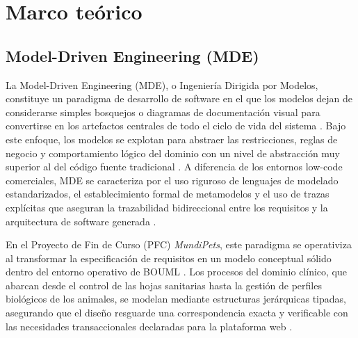 \documentclass[journal,onecolumn]{IEEEtran}
\begin{document}
	\section{Marco teórico}
	
	\subsection{Model-Driven Engineering (MDE)}
	La Model-Driven Engineering (MDE), o Ingeniería Dirigida por Modelos, constituye un paradigma de desarrollo de software en el que los modelos dejan de considerarse simples bosquejos o diagramas de documentación visual para convertirse en los artefactos centrales de todo el ciclo de vida del sistema \cite{Brambilla2017, Schmidt2006}. Bajo este enfoque, los modelos se explotan para abstraer las restricciones, reglas de negocio y comportamiento lógico del dominio con un nivel de abstracción muy superior al del código fuente tradicional \cite{Selic2003, Whittle2014}. A diferencia de los entornos low-code comerciales, MDE se caracteriza por el uso riguroso de lenguajes de modelado estandarizados, el establecimiento formal de metamodelos y el uso de trazas explícitas que aseguran la trazabilidad bidireccional entre los requisitos y la arquitectura de software generada \cite{DiRuscio2022LowCodeMDE, Bucaioni2022}.
	
	En el Proyecto de Fin de Curso (PFC) \textit{MundiPets}, este paradigma se operativiza al transformar la especificación de requisitos en un modelo conceptual sólido dentro del entorno operativo de BOUML \cite{ERSMundiPets2026, GuiaMDD2026}. Los procesos del dominio clínico, que abarcan desde el control de las hojas sanitarias hasta la gestión de perfiles biológicos de los animales, se modelan mediante estructuras jerárquicas tipadas, asegurando que el diseño resguarde una correspondencia exacta y verificable con las necesidades transaccionales declaradas para la plataforma web \cite{ERSMundiPets2026, GuiaMDD2026}.
	
\end{document}

